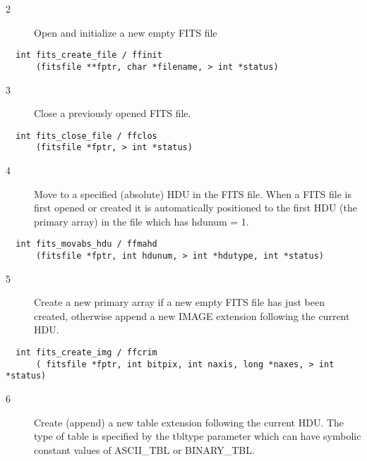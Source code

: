 \begin{description}
\item[2 ] Open and initialize a new empty FITS file
\end{description}

\begin{verbatim}
  int fits_create_file / ffinit
      (fitsfile **fptr, char *filename, > int *status)
\end{verbatim}

\begin{description}
\item[3 ]Close a previously opened FITS file.
\end{description}

\begin{verbatim}
  int fits_close_file / ffclos
      (fitsfile *fptr, > int *status)
\end{verbatim}

\begin{description}
\item[4 ] Move to a specified (absolute) HDU in the FITS file.  When a FITS file
    is first opened or created it is automatically positioned to the first
   HDU (the primary array) in the file which has hdunum = 1.
\end{description}

\begin{verbatim}
  int fits_movabs_hdu / ffmahd
      (fitsfile *fptr, int hdunum, > int *hdutype, int *status)
\end{verbatim}

\begin{description}
\item[5 ]Create a new primary array if a new empty FITS file has just been
  created, otherwise append a new IMAGE extension following the current HDU.
\end{description}

\begin{verbatim}
  int fits_create_img / ffcrim
      ( fitsfile *fptr, int bitpix, int naxis, long *naxes, > int *status)
\end{verbatim}

\begin{description}
\item[6 ]Create (append) a new table extension following the current HDU.
   The type of table is specified by the tbltype parameter which can have
  symbolic constant values of ASCII\_TBL or BINARY\_TBL.
\end{description}


